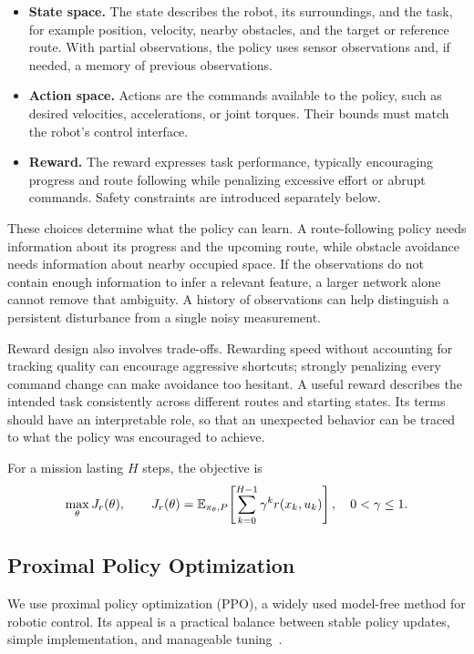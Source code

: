 \begin{itemize}
\item \textbf{State space.} The state describes the robot, its surroundings, and the task, for example position, velocity, nearby obstacles, and the target or reference route. With partial observations, the policy uses sensor observations and, if needed, a memory of previous observations.
\item \textbf{Action space.} Actions are the commands available to the policy, such as desired velocities, accelerations, or joint torques. Their bounds must match the robot's control interface.
\item \textbf{Reward.} The reward expresses task performance, typically encouraging progress and route following while penalizing excessive effort or abrupt commands. Safety constraints are introduced separately below.
\end{itemize}

These choices determine what the policy can learn. A route-following policy needs information about its progress and the upcoming route, while obstacle avoidance needs information about nearby occupied space. If the observations do not contain enough information to infer a relevant feature, a larger network alone cannot remove that ambiguity. A history of observations can help distinguish a persistent disturbance from a single noisy measurement.

Reward design also involves trade-offs. Rewarding speed without accounting for tracking quality can encourage aggressive shortcuts; strongly penalizing every command change can make avoidance too hesitant. A useful reward describes the intended task consistently across different routes and starting states. Its terms should have an interpretable role, so that an unexpected behavior can be traced to what the policy was encouraged to achieve.

For a mission lasting $H$ steps, the objective is
\begin{equation}
\max_\theta J_r(\theta),\qquad
J_r(\theta)=\mathbb E_{\pi_\theta,P}\!\left[\sum_{k=0}^{H-1}\gamma^k r(x_k,u_k)\right],
\quad 0<\gamma\leq1.
\label{lit:return}
\end{equation}


\subsection{Proximal Policy Optimization}
We use proximal policy optimization (PPO), a widely used model-free method for robotic control. Its appeal is a practical balance between stable policy updates, simple implementation, and manageable tuning~\cite{litPPO2017}. 


